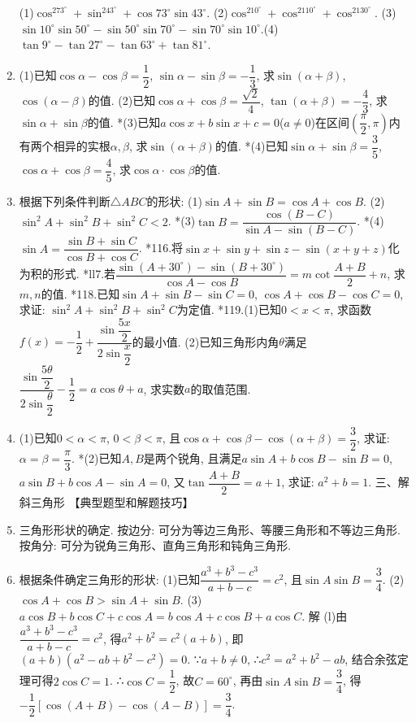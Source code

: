 \documentclass[10pt,a4paper]{article}
\begin{document}
\begin{enumerate}[1.]
(1)$\cos ^273^\circ +\sin ^243^\circ +\cos 73^\circ \sin 43^\circ$.		(2)$\cos ^210^\circ +\cos ^2110^\circ +\cos ^2130^\circ$.
(3)$\sin 10^\circ \sin 50^\circ -\sin 50^\circ \sin 70^\circ -\sin 70^\circ \sin 10^\circ$.(4)$\tan 9^\circ -\tan 27^\circ -\tan 63^\circ +\tan 81^\circ$.
\item (1)已知$\cos \alpha -\cos \beta =\dfrac 12$, $\sin \alpha -\sin \beta =-\dfrac 13$, 求$\sin (\alpha +\beta)$, $\cos (\alpha -\beta)$的值.
(2)已知$\cos \alpha +\cos \beta =\dfrac{\sqrt 2}4$, $\tan (\alpha +\beta)=-\dfrac 43$, 求$\sin \alpha +\sin \beta$的值.
*(3)已知$a\cos x+b\sin x+c=0$($a\ne 0$)在区间$(\dfrac{\pi}2,\pi)$内有两个相异的实根$\alpha ,\beta$, 求$\sin (\alpha +\beta)$的值.
*(4)已知$\sin \alpha +\sin \beta =\dfrac 35$, $\cos \alpha +\cos \beta =\dfrac 45$, 求$\cos \alpha \cdot \cos \beta$的值.
\item 根据下列条件判断$\triangle ABC$的形状:
(1)$\sin A+\sin B=\cos A+\cos B$.			(2)$\sin ^2A+\sin ^2B+\sin ^2C<2$.
*(3)$\tan B=\dfrac{\cos (B-C)}{\sin A-\sin (B-C)}$.			*(4)$\sin A=\dfrac{\sin B+\sin C}{\cos B+\cos C}$.
*116.将$\sin x+\sin y+\sin z-\sin (x+y+z)$化为积的形式.
*ll7.若$\dfrac{\sin (A+30^\circ)-\sin (B+30^\circ)}{\cos A-\cos B}=m\cot \dfrac{A+B}2+n$, 求$m,n$的值.
*118.已知$\sin A+\sin B-\sin C=0$, $\cos A+\cos B-\cos C=0$, 求证: $\sin ^2A+\sin ^2B+\sin ^2C$为定值.
*119.(1)已知$0<x<\pi$, 求函数$f(x)=-\dfrac 12+\dfrac{\sin \dfrac{5x}2}{2\sin \dfrac x2}$的最小值.
(2)已知三角形内角$\theta$满足$\dfrac{\sin \dfrac{5\theta}2}{2\sin \dfrac{\theta}2}-\dfrac 12=a\cos \theta +a$, 求实数$a$的取值范围.
\item (1)已知$0<\alpha <\pi$, $0<\beta <\pi$, 且$\cos \alpha +\cos \beta -\cos (\alpha +\beta)=\dfrac 32$, 求证: $\alpha =\beta =\dfrac{\pi}3$.
*(2)已知$A,B$是两个锐角, 且满足$a\sin A+b\cos B-\sin B=0$, $a\sin B+b\cos A-\sin A=0$, 又$\tan \dfrac{A+B}2=a+1$, 求证: $a^2+b=1$.
三、解斜三角形
【典型题型和解题技巧】
\item 三角形形状的确定.
按边分: 可分为等边三角形、等腰三角形和不等边三角形.
按角分: 可分为锐角三角形、直角三角形和钝角三角形.
\item 根据条件确定三角形的形状:
(1)已知$\dfrac{a^3+b^3-c^3}{a+b-c}=c^2$, 且$\sin A\sin B=\dfrac 34$.
(2)$\cos A+\cos B>\sin A+\sin B$.
(3)$a\cos B+b\cos C+c\cos A=b\cos A+c\cos B+a\cos C$.
解  (l)由$\dfrac{a^3+b^3-c^3}{a+b-c}=c^2$, 得$a^2+b^2=c^2(a+b)$, 即$(a+b)(a^2-ab+b^2-c^2)=0$.
∵$a+b\ne 0$, ∴$c^2=a^2+b^2-ab$, 结合余弦定理可得$2\cos C=1$.
∴$\cos C=\dfrac 12$, 故$C=60^{\circ}$, 再由$\sin A\sin B=\dfrac 34$, 得$-\dfrac 12[\cos (A+B)-\cos (A-B)]=\dfrac 34$.

\end{enumerate}
\end{document}
